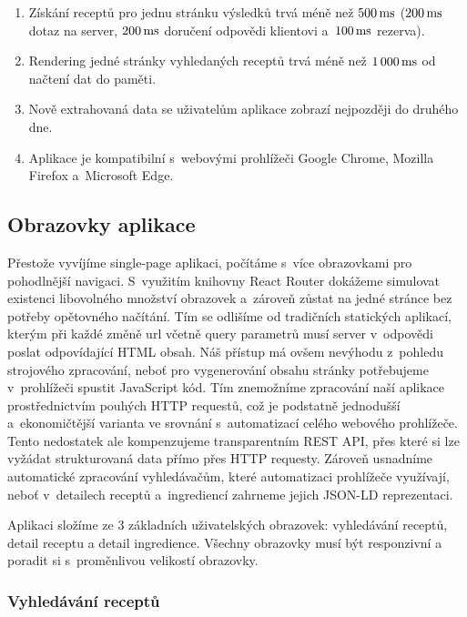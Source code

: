 \begin{enumerate}
    \item Získání receptů pro jednu stránku výsledků trvá méně než $500\,\rm ms$ ($200\,\rm ms$ dotaz na server, $200\,\rm ms$ doručení odpovědi klientovi a~$100\,\rm ms$ rezerva).
    \item Rendering jedné stránky vyhledaných receptů trvá méně než $1\,000\,\rm ms$ od načtení dat do paměti.
    \item Nově extrahovaná data se uživatelům aplikace zobrazí nejpozději do druhého dne. 
    \item Aplikace je kompatibilní s~webovými prohlížeči Google Chrome, Mozilla Firefox a~Microsoft Edge.
\end{enumerate}

\subsection{Obrazovky aplikace}

Přestože vyvíjíme single-page aplikaci, počítáme s~více obrazovkami pro pohodlnější navigaci. S~využitím knihovny React Router dokážeme simulovat existenci libovolného množství obrazovek a~zároveň zůstat na jedné stránce bez potřeby opětovného načítání. Tím se odlišíme od tradičních statických aplikací, kterým při každé změně url včetně query parametrů musí server v~odpovědi poslat odpovídající HTML obsah. Náš přístup má ovšem nevýhodu z~pohledu strojového zpracování, neboť pro vygenerování obsahu stránky potřebujeme v~prohlížeči spustit JavaScript kód. Tím znemožníme zpracování naší aplikace prostřednictvím pouhých HTTP requestů, což je podstatně jednodušší a~ekonomičtější varianta ve srovnání s~automatizací celého webového prohlížeče. Tento nedostatek ale kompenzujeme transparentním REST API, přes které si lze vyžádat strukturovaná data přímo přes HTTP requesty. Zároveň usnadníme automatické zpracování vyhledávačům, které automatizaci prohlížeče využívají, neboť v~detailech receptů a~ingrediencí zahrneme jejich JSON-LD reprezentaci.

Aplikaci složíme ze $3$ základních uživatelských obrazovek: vyhledávání receptů, detail receptu a detail ingredience. Všechny obrazovky musí být responzivní a poradit si s~proměnlivou velikostí obrazovky.

\subsubsection{Vyhledávání receptů}

